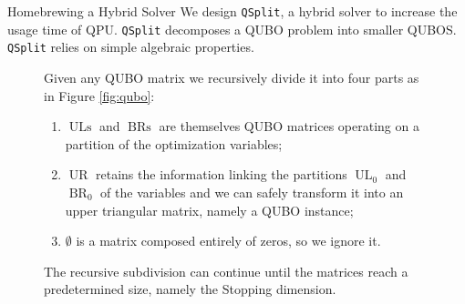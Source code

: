 \begin{block}{Homebrewing a Hybrid Solver}
    We design \texttt{QSplit}, a hybrid solver to increase the usage time of QPU.
    \texttt{QSplit} decomposes a QUBO problem into smaller QUBOS.
    \texttt{QSplit} relies on simple algebraic properties.

    \begin{figure}[h!]
        \centering
        \begin{minipage}{0.55\textwidth}
            Given any QUBO matrix we recursively divide it into four parts as in Figure \ref{fig:qubo}:
            \begin{enumerate}
                \item $\operatorname{ULs}$ and $\operatorname{BRs}$ are themselves QUBO matrices operating on a partition of the optimization variables;
                \item $\operatorname{UR}$ retains the information linking the partitions $\operatorname{UL}_0$ and $\operatorname{BR}_0$ of the variables and we can safely transform it into an upper triangular matrix, namely a QUBO instance;
                \item $\emptyset$ is a matrix composed entirely of zeros, so we ignore it.
            \end{enumerate}

            The recursive subdivision can continue until the matrices reach a predetermined size, namely the Stopping dimension.
        \end{minipage}%
        \hfill
        \begin{minipage}{0.4\textwidth}
            \centering
\end{minipage}
\end{figure}
\end{block}
